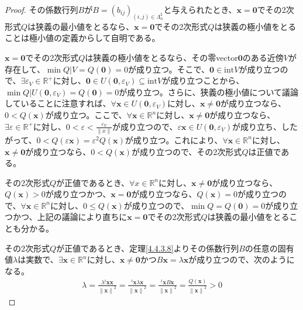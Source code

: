 \documentclass[dvipdfmx]{jsarticle}
\begin{document}
\begin{proof}
その係数行列$B$が$B = \left( b_{ij} \right)_{(i,j) \in \varLambda_{n}^{2}}$と与えられたとき、$\mathbf{x} = \mathbf{0}$でその2次形式$Q$は狭義の最小値をとるなら、$\mathbf{x} = \mathbf{0}$でその2次形式$Q$は狭義の極小値をとることは極小値の定義からして自明である。\par
$\mathbf{x} = \mathbf{0}$でその2次形式$Q$は狭義の極小値をとるなら、その零vector$\mathbf{0}$のある近傍$V$が存在して、$\min{Q|V} = Q\left( \mathbf{0} \right) = 0$が成り立つ。そこで、$\mathbf{0} \in \mathrm{int}V$が成り立つので、$\exists\varepsilon_{V} \in \mathbb{R}^{+}$に対し、$\mathbf{0} \in U\left( \mathbf{0},\varepsilon_{V} \right) \subseteq \mathrm{int}V$が成り立つことから、$\min{Q|U\left( \mathbf{0},\varepsilon_{V} \right)} = Q\left( \mathbf{0} \right) = 0$が成り立つ。さらに、狭義の極小値について議論していることに注意すれば、$\forall\mathbf{x} \in U\left( \mathbf{0},\varepsilon_{V} \right)$に対し、$\mathbf{x} \neq \mathbf{0}$が成り立つなら、$0 < Q\left( \mathbf{x} \right)$が成り立つ。ここで、$\forall\mathbf{x} \in \mathbb{R}^{n}$に対し、$\mathbf{x} \neq \mathbf{0}$が成り立つなら、$\exists\varepsilon \in \mathbb{R}^{+}$に対し、$0 < \varepsilon < \frac{\varepsilon_{V}}{\left\| x \right\|}$が成り立つので、$\varepsilon\mathbf{x} \in U\left( \mathbf{0},\varepsilon_{V} \right)$が成り立ち、したがって、$0 < Q\left( \varepsilon\mathbf{x} \right) = \varepsilon^{2}Q\left( \mathbf{x} \right)$が成り立つ。これにより、$\forall\mathbf{x} \in \mathbb{R}^{n}$に対し、$\mathbf{x} \neq \mathbf{0}$が成り立つなら、$0 < Q\left( \mathbf{x} \right)$が成り立つので、その2次形式$Q$は正値である。\par
その2次形式$Q$が正値であるとき、$\forall x \in \mathbb{R}^{n}$に対し、$\mathbf{x} \neq \mathbf{0}$が成り立つなら、$Q\left( \mathbf{x} \right) > 0$が成り立つかつ、$\mathbf{x} = \mathbf{0}$が成り立つなら、$Q\left( \mathbf{x} \right) = 0$が成り立つので、$\forall\mathbf{x} \in \mathbb{R}^{n}$に対し、$0 \leq Q\left( \mathbf{x} \right)$が成り立つので、$\min Q = Q\left( \mathbf{0} \right) = 0$が成り立つかつ、上記の議論により直ちに$\mathbf{x} = \mathbf{0}$でその2次形式$Q$は狭義の最小値をとることも分かる。\par
その2次形式$Q$が正値であるとき、定理\ref{4.4.3.8}よりその係数行列$B$の任意の固有値$\lambda$は実数で、$\exists\mathbf{x} \in \mathbb{R}^{n}$に対し、$\mathbf{x} \neq \mathbf{0}$かつ$B\mathbf{x} = \lambda\mathbf{x}$が成り立つので、次のようになる。
\begin{align*}
\lambda = \frac{\lambda{}^t \mathbf{xx}}{\left\| \mathbf{x} \right\|^{2}} = \frac{{}^t \mathbf{x}\lambda\mathbf{x}}{\left\| \mathbf{x} \right\|^{2}} = \frac{{}^t \mathbf{x}B\mathbf{x}}{\left\| \mathbf{x} \right\|^{2}} = \frac{Q\left( \mathbf{x} \right)}{\left\| \mathbf{x} \right\|^{2}} > 0

\end{align*}
\end{proof}
\end{document}
